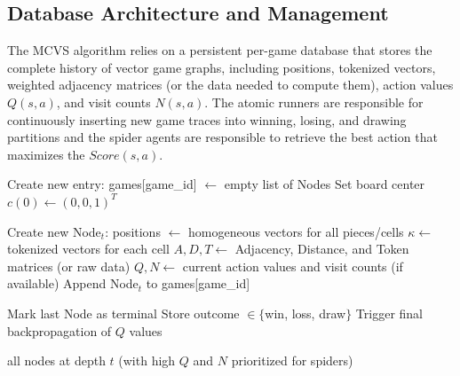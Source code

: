 \documentclass[11pt,a4paper]{article}
\theoremstyle{plain}
\theoremstyle{definition}
\begin{document}
\vspace{0.5em}

\newpage

\vspace{0.5em}

\subsection{Database Architecture and Management}

\vspace{0.5em}

The MCVS algorithm relies on a persistent per-game database that stores the complete history of vector game graphs, including positions, tokenized vectors, weighted adjacency matrices (or the data needed to compute them), action values \(Q(s,a)\), and visit counts \(N(s,a)\). The atomic runners are responsible for continuously inserting new game traces into winning, losing, and drawing partitions and the spider agents are responsible to retrieve the best action that maximizes the $Score(s,a)$.

\vspace{0.5em}

\begin{algorithm}[H]
\caption{Database Creation and Node Storage}
\label{alg:database_creation}
\begin{algorithmic}[1]
    \State Create new entry: games[game\_id] $\gets$ empty list of Nodes
    \State Set board center $c(0) \gets (0,0,1)^T$
\EndProcedure

    \State Create new Node$_t$:
    \State \quad positions $\gets$ homogeneous vectors for all pieces/cells
    \State \quad $\kappa \gets$ tokenized vectors for each cell
    \State \quad $A, D, T \gets$ Adjacency, Distance, and Token matrices (or raw data)
    \State \quad $Q, N \gets$ current action values and visit counts (if available)
    \State Append Node$_t$ to games[game\_id]
\EndProcedure

    \State Mark last Node as terminal
    \State Store outcome $\in \{$win, loss, draw$\}$
    \State Trigger final backpropagation of $Q$ values
\EndProcedure

    \State \Return all nodes at depth $t$ (with high $Q$ and $N$ prioritized for spiders)
\EndProcedure
\end{algorithmic}
\end{algorithm}
\end{document}
